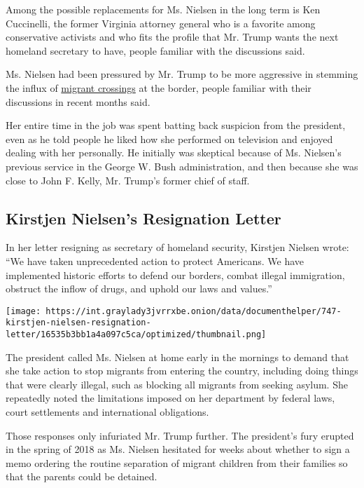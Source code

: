 Among the possible replacements for Ms. Nielsen in the long term is Ken
Cuccinelli, the former Virginia attorney general who is a favorite among
conservative activists and who fits the profile that Mr. Trump wants the
next homeland secretary to have, people familiar with the discussions
said.

Ms. Nielsen had been pressured by Mr. Trump to be more aggressive in
stemming the influx of
\href{https://www.nytimes3xbfgragh.onion/2019/03/05/us/border-crossing-increase.html}{migrant
crossings} at the border, people familiar with their discussions in
recent months said.

Her entire time in the job was spent batting back suspicion from the
president, even as he told people he liked how she performed on
television and enjoyed dealing with her personally. He initially was
skeptical because of Ms. Nielsen's previous service in the George W.
Bush administration, and then because she was close to John F. Kelly,
Mr. Trump's former chief of staff.

\hypertarget{kirstjen-nielsens-resignation-letter}{%
\subsection{Kirstjen Nielsen's Resignation
Letter}\label{kirstjen-nielsens-resignation-letter}}

In her letter resigning as secretary of homeland security, Kirstjen
Nielsen wrote: ``We have taken unprecedented action to protect
Americans. We have implemented historic efforts to defend our borders,
combat illegal immigration, obstruct the inflow of drugs, and uphold our
laws and values.''

\texttt{[image: https://int.graylady3jvrrxbe.onion/data/documenthelper/747-kirstjen-nielsen-resignation-letter/16535b3bb1a4a097c5ca/optimized/thumbnail.png]}

The president called Ms. Nielsen at home early in the mornings to demand
that she take action to stop migrants from entering the country,
including doing things that were clearly illegal, such as blocking all
migrants from seeking asylum. She repeatedly noted the limitations
imposed on her department by federal laws, court settlements and
international obligations.

Those responses only infuriated Mr. Trump further. The president's fury
erupted in the spring of 2018 as Ms. Nielsen hesitated for weeks about
whether to sign a memo ordering the routine separation of migrant
children from their families so that the parents could be detained.

